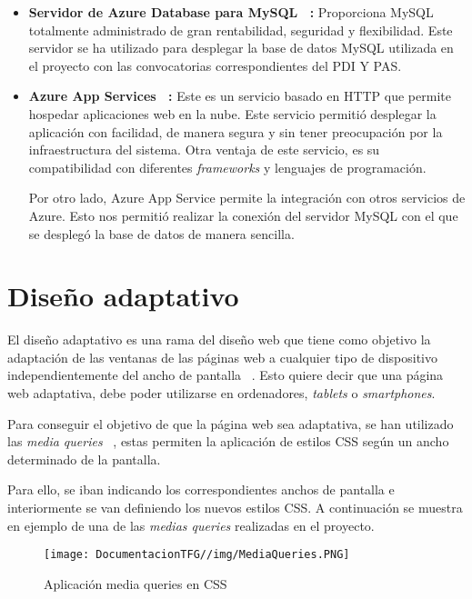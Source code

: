 \begin{itemize}
    \item \textbf{Servidor de Azure Database para MySQL ~\cite{azuremysql:latex}:} Proporciona MySQL totalmente administrado de gran rentabilidad, seguridad y flexibilidad. 
    Este servidor se ha utilizado para desplegar la base de datos MySQL utilizada en el proyecto con las convocatorias correspondientes del PDI Y PAS.
     \item \textbf{Azure App Services ~\cite{azureappservices:latex}:} Este es un servicio basado en HTTP que permite hospedar aplicaciones web en la nube. Este servicio permitió desplegar la aplicación con facilidad, de manera segura y sin tener preocupación por la infraestructura del sistema. Otra ventaja de este servicio, es su compatibilidad con diferentes \textit{frameworks} y lenguajes de programación. 
     
     Por otro lado, Azure App Service permite la integración con otros servicios de Azure. Esto nos permitió realizar la conexión del servidor  MySQL con el que se desplegó la base de datos de manera sencilla.
     

\end{itemize}


\section{Diseño adaptativo}

El diseño adaptativo es una rama del diseño web que tiene como objetivo la adaptación de las ventanas de las páginas web a cualquier tipo de dispositivo independientemente del ancho de pantalla ~\cite{adaptativo:latex}. Esto quiere decir que una página web adaptativa, debe poder utilizarse en ordenadores, \textit{tablets} o \textit{smartphones}. 

Para conseguir el objetivo de que la página web sea adaptativa, se han utilizado las \textit{media queries} ~\cite{mediaqueries:latex}, estas permiten la aplicación de estilos CSS según un ancho determinado de la pantalla.

Para ello, se iban indicando los correspondientes anchos de pantalla e interiormente se van definiendo los nuevos estilos CSS. A continuación se muestra en ejemplo de una de las \textit{medias queries} realizadas en el proyecto.

\begin{figure}[H]
    \centering
    \texttt{[image: DocumentacionTFG//img/MediaQueries.PNG]}
    \caption{Aplicación media queries en CSS}
\end{figure}

